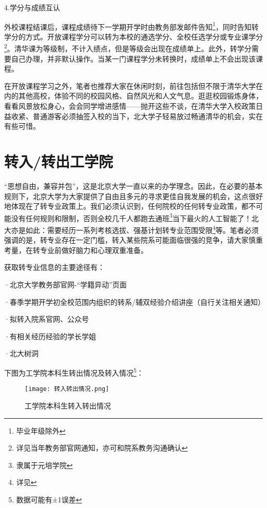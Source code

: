 \documentclass[11pt,oneside]{book}
\begin{document}
\vspace{10pt}

4.学分与成绩互认

外校课程结课后，课程成绩待下一学期开学时由教务部发邮件告知\footnote{毕业年级除外}，同时告知转学分的方式。开放课程学分可以转为本校的通选学分、全校任选学分或专业课学分\footnote{详见当年教务部官网通知，亦可和院系教务沟通确认}。清华课为等级制，不计入绩点，但是等级会出现在成绩单上。此外，转学分需要自己办理，并非默认操作。当某一门课程学分未转换时，成绩单上不会出现该课程。

\vspace{10pt}

在开放课程学习之外，笔者也推荐大家在休闲时刻，前往包括但不限于清华大学在内的其他高校，体验不同的校园风格、自然风光和人文气息。逛逛校园锻炼身体，看看风景放松身心，会会同学增进感情——抛开这些不谈，在清华大学入校政策日益收紧、普通游客必须抽签入校的当下，北大学子轻易放过畅通清华的机会，实在有些可惜。

\section{转入/转出工学院}
“思想自由，兼容并包”，这是北京大学一直以来的办学理念。因此，在必要的基本规则下，北京大学为大家提供了自由且多元的寻求更佳自我发展的机会，这点很好地体现在了转专业政策上。我们必须认识到，任何院校的任何转专业政策，都不可能没有任何规则和限制，否则全校几千人都跑去通班\footnote{隶属于元培学院}当下最火的人工智能了！北大亦是如此：需要经历一系列考核选拔、强基计划转专业范围受限\footnote{详见}等。笔者必须强调的是，转专业存在一定门槛，转入某些院系可能面临很强的竞争，请大家慎重考量，在转专业前做好脑力和心理双重准备。

\vspace{10pt}

获取转专业信息的主要途径有：

·北京大学教务部官网-“学籍异动”页面

·春季学期开学初全校范围内组织的转系/辅双经验介绍讲座（自行关注相关通知）

·拟转入院系官网、公众号

·有相关经历经验的学长学姐

·北大树洞


下图为工学院本科生转出情况及转入情况\footnote{数据可能有±1误差}：
\begin{figure}[htbp]
    \centering
    \texttt{[image: 转入转出情况.png]}
    \renewcommand{\figurename}{图}
    \caption{工学院本科生转入转出情况}
    \label{fig:enter-label}
\end{figure}
\end{document}
